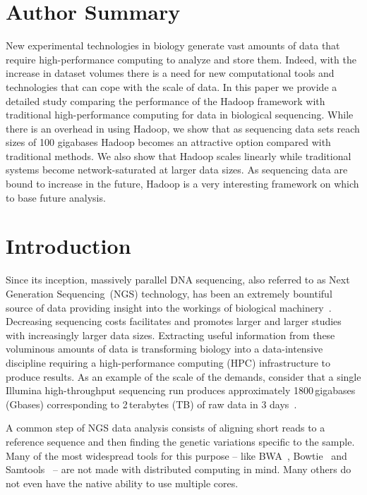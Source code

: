 \documentclass[10pt]{article}
\begin{document}
\section*{Author Summary}
New experimental technologies in biology generate vast amounts of data that require
high-performance computing
to analyze and store them. Indeed, with the increase in dataset volumes there is a need for new computational tools and technologies that can cope with the scale of data. In this paper we provide a detailed study comparing the performance of the Hadoop framework with traditional high-performance computing for data in biological sequencing. While there is an overhead in using Hadoop, we show that as sequencing data sets reach sizes of 100 gigabases Hadoop becomes an attractive option compared with traditional methods. We also show that Hadoop scales linearly while traditional systems become network-saturated at larger data sizes. As sequencing data are bound to increase in the future, Hadoop is a very interesting framework on which to base future analysis.





\section*{Introduction}
Since its inception, massively parallel DNA sequencing, also referred to as Next Generation Sequencing~(NGS) technology, has been an extremely bountiful source of data providing insight into the workings of biological machinery~\cite{metzker, Marx:2013fk}. Decreasing sequencing costs facilitates and promotes larger and larger studies with increasingly larger data sizes. Extracting useful information from these voluminous amounts of data is transforming biology into a data-intensive discipline requiring a high-performance computing (HPC) infrastructure to produce results.  As an example of the scale of the demands, consider that a single Illumina high-throughput sequencing run produces approximately 1800\,gigabases (Gbases) corresponding to 2\,terabytes (TB) of raw data in 3 days~\cite{illumina}.

A common step of NGS data analysis consists of aligning short reads to a reference sequence and then finding the genetic variations specific to the sample.
Many of the most widespread tools for this purpose -- like BWA~\cite{bwa}, Bowtie~\cite{Langmead:2009uq} and Samtools~\cite{samtools} -- are not made with distributed computing in mind. Many others do not even have the native ability to use multiple cores.
\end{document}

